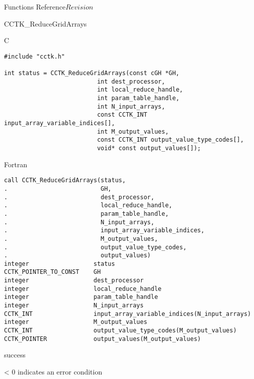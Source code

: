 \begin{cactuspart}{ Functions Reference}{}{$Revision$}
\begin{FunctionDescription}{CCTK\_ReduceGridArrays}
\begin{SynopsisSection}
\begin{Synopsis}{C}
\begin{verbatim}
#include "cctk.h"

int status = CCTK_ReduceGridArrays(const cGH *GH,
                          int dest_processor,
                          int local_reduce_handle,
                          int param_table_handle,
                          int N_input_arrays,
                          const CCTK_INT input_array_variable_indices[],
                          int M_output_values,
                          const CCTK_INT output_value_type_codes[],
                          void* const output_values[]);
\end{verbatim}
\end{Synopsis}
\begin{Synopsis}{Fortran}
\begin{verbatim}
call CCTK_ReduceGridArrays(status,
.                          GH,
.                          dest_processor,
.                          local_reduce_handle,
.                          param_table_handle,
.                          N_input_arrays,
.                          input_array_variable_indices,
.                          M_output_values,
.                          output_value_type_codes,
.                          output_values)
integer                  status
CCTK_POINTER_TO_CONST    GH
integer                  dest_processor
integer                  local_reduce_handle
integer                  param_table_handle
integer                  N_input_arrays
CCTK_INT                 input_array_variable_indices(N_input_arrays)
integer                  M_output_values
CCTK_INT                 output_value_type_codes(M_output_values)
CCTK_POINTER             output_values(M_output_values)
\end{verbatim}
\end{Synopsis}
\end{SynopsisSection}

\begin{ResultSection}
\begin{Result}{0} success \end{Result}
\begin{Result}{< 0} indicates an error condition \end{Result}
\end{ResultSection}


\end{FunctionDescription}
\end{cactuspart}
